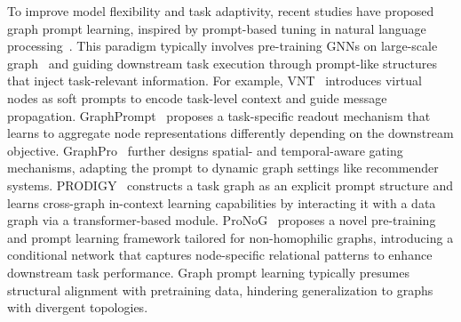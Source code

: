To improve model flexibility and task adaptivity, recent studies have proposed graph prompt learning, inspired by prompt-based tuning in natural language processing~\cite{wei2023chainofthought,zhou2023docprompting}. This paradigm typically involves pre-training GNNs on large-scale graph~\cite{hu2020gpt,graphcl,qiu2020gcc,zhao2024all,yu2023generalized} and guiding downstream task execution through prompt-like structures that inject task-relevant information.
For example, VNT~\cite{VNT} introduces virtual nodes as soft prompts to encode task-level context and guide message propagation. GraphPrompt~\cite{graphprompt} proposes a task-specific readout mechanism that learns to aggregate node representations differently depending on the downstream objective. GraphPro~\cite{yang2024graphpro} further designs spatial- and temporal-aware gating mechanisms, adapting the prompt to dynamic graph settings like recommender systems. PRODIGY~\cite{mishchenko2023prodigy} constructs a task graph as an explicit prompt structure and learns cross-graph in-context learning capabilities by interacting it with a data graph via a transformer-based module. ProNoG~\cite{Yu2025ProNoG} proposes a novel pre-training and prompt learning framework tailored for non-homophilic graphs, introducing a conditional network that captures node-specific relational patterns to enhance downstream task performance. 
Graph prompt learning typically presumes structural alignment with pretraining data, hindering generalization to graphs with divergent topologies.

